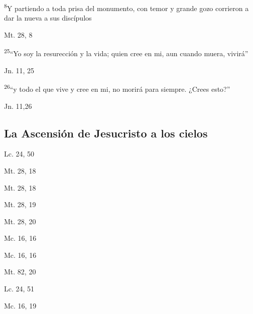\documentclass[a4paper,11pt]{article}
\begin{document}
      \textsuperscript{8}Y partiendo a toda prisa del monumento, con temor y grande gozo corrieron a dar la nueva a sus discípulos
      \begin{flushright}
        Mt. 28, 8       
      \end{flushright}      
      \textsuperscript{25}``Yo soy la resurección y la vida; quien cree en mi, aun cuando muera, vivirá''
      \begin{flushright}
        Jn. 11, 25    
      \end{flushright}      
      \textsuperscript{26}``y todo el que vive y cree en mi, no morirá para siempre. ¿Crees esto?''
      \begin{flushright}
        Jn. 11,26     
      \end{flushright}
    \subsection*{\hfil La Ascensión de Jesucristo a los cielos \hfil}
      \begin{flushright}
        Lc. 24, 50     
      \end{flushright}      
      \begin{flushright}
        Mt. 28, 18      
      \end{flushright}      
      \begin{flushright}
        Mt. 28, 18     
      \end{flushright}      
      \begin{flushright}
        Mt. 28, 19      
      \end{flushright}      
      \begin{flushright}
        Mt. 28, 20  
      \end{flushright}      
      \begin{flushright}
        Mc. 16, 16
      \end{flushright}      
      \begin{flushright}
        Mc. 16, 16
      \end{flushright}      
      \begin{flushright}
        Mt. 82, 20
      \end{flushright}      
      \begin{flushright}
        Lc. 24, 51
      \end{flushright}      
      \begin{flushright}
        Mc. 16, 19
      \end{flushright}
\end{document}
